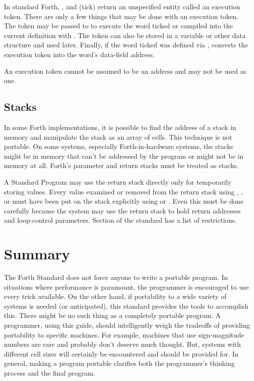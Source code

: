 In standard Forth, , \word{[']} and  (tick) return an
unspecified entity called an execution token. There are only a
few things that may be done with an execution token. The token may be
passed to  to execute the word ticked or compiled into
the current definition with . The token can also be
stored in a variable or other data structure and used later.
Finally, if the word ticked was defined via , 
converts the execution token into the word's data-field address.

An execution token cannot be assumed to be an address and may not
be used as one.


\subsection{Stacks} %

In some Forth implementations, it is possible to find the address of
a stack in memory and manipulate the stack as an array of cells. This
technique is not portable. On some systems, especially
Forth-in-hardware systems, the stacks might be in memory
that can't be addressed by the program or might not be in memory at
all. Forth's parameter and return stacks must be treated as stacks.

A Standard Program may use the return stack directly only for
temporarily storing values. Every value examined or removed from the
return stack using , , or  must have been
put on the stack explicitly using  or . Even this
must be done carefully because the system may use the return stack to
hold return addresses and loop-control parameters. Section
 of the standard has a
list of restrictions.


\section{Summary} %

The Forth Standard does not force anyone to write
a portable program. In situations where performance is paramount,
the programmer is encouraged to use every trick available. On the
other hand, if portability to a wide variety of systems is needed%
(or anticipated), this standard provides the tools to accomplish this. There
might be no such thing as a completely portable program. A programmer, using
this guide, should intelligently weigh the tradeoffs of providing
portability to specific machines. For example, machines that use
sign-magnitude numbers are rare and probably don't deserve much
thought. But, systems with different cell sizes will certainly be
encountered and should be provided for. In general, making a program
portable clarifies both the programmer's thinking process and the
final program.